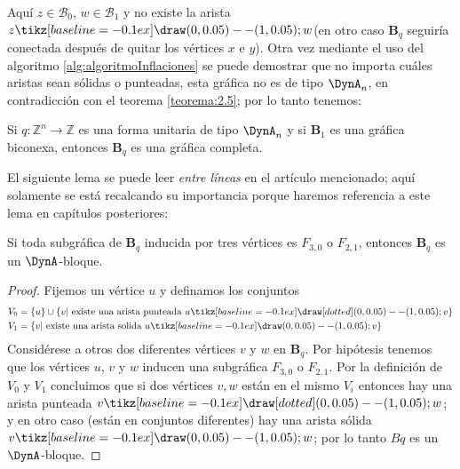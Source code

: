 Aquí $z \in \mathcal{B}_{0}$, $w \in \mathcal{B}_{1}$ y no existe la arista $z \tikz[baseline=-0.1ex]\draw (0,0.05) -- (1,0.05); w$(en otro caso $\textbf{B}_{q}$ seguiría conectada después de quitar los vértices $x$ e $y$). Otra vez mediante el uso del algoritmo \ref{alg:algoritmoInflaciones} se puede demostrar que no importa cuáles aristas sean sólidas o punteadas, esta gráfica no es de tipo $\DynA_{n}$, en contradicción con el teorema \ref{teorema:2.5}; por lo tanto tenemos:\\

\begin{lemma}
Si $q:\mathbb{Z}^{n} \rightarrow \mathbb{Z}$ es una forma unitaria de tipo $\DynA_{n}$ y si $\textbf{B}_{1}$ es una gráfica biconexa, entonces $\textbf{B}_{q}$ es una gráfica completa.
\label{lema:2.7}
\end{lemma}

El siguiente lema se puede leer \textit{entre líneas} en el artículo mencionado; aquí solamente se está recalcando su importancia porque haremos referencia a este lema en capítulos posteriores:

\begin{lemma}
Si toda subgráfica de $\textbf{B}_{q}$ inducida por tres vértices es $F_{3,0}$ o $F_{2,1}$, entonces $\textbf{B}_{q}$ es un $\DynA$-bloque.
\label{lema:2.8}
\end{lemma}

\begin{proof}
Fijemos un vértice $u$ y definamos los conjuntos
\begin{equation*}
\begin{split}
V_{0} & = \{u\} \cup \{v |  \mbox{  existe una arista punteada } u \tikz[baseline=-0.1ex]\draw[dotted] (0,0.05) -- (1,0.05); v\}\\
V_{1} & = \{v |  \mbox{ existe una arista solida } u \tikz[baseline=-0.1ex]\draw (0,0.05) -- (1,0.05); v\}
\end{split}
\end{equation*}
Considérese a otros dos diferentes vértices $v$ y $w$ en $\textbf{B}_{q}$. Por hipótesis tenemos que los vértices $u$, $v$ y $w$ inducen una subgráfica $F_{3,0}$ o $F_{2,1}$. Por la definición de $V_{0}$ y $V_{1}$ concluimos que si dos vértices $v, w$ están en el mismo $V_{i}$ entonces hay una arista punteada $v \tikz[baseline=-0.1ex]\draw[dotted](0,0.05) -- (1,0.05); w$; y en otro caso (están en conjuntos diferentes) hay una arista sólida $v \tikz[baseline=-0.1ex]\draw(0,0.05) -- (1,0.05); w$; por lo tanto $Bq$ es un $\DynA$-bloque.
\end{proof}


